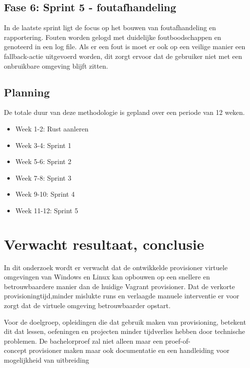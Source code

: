 \subsection{Fase 6: Sprint 5 - foutafhandeling}
In de laatste sprint ligt de focus op het bouwen van foutafhandeling en rapportering. Fouten worden gelogd met duidelijke foutboodschappen en genoteerd in een log file. Als er een fout is moet er ook op een veilige manier een fallback-actie uitgevoerd worden, dit zorgt ervoor dat de gebruiker niet met een onbruikbare omgeving blijft zitten.


\subsection{Planning}
De totale duur van deze methodologie is gepland over een periode van 12 weken.
\begin{itemize}
    \item Week 1-2: Rust aanleren
    \item Week 3-4: Sprint 1
    \item Week 5-6: Sprint 2
    \item Week 7-8: Sprint 3
    \item Week 9-10: Sprint 4
    \item Week 11-12: Sprint 5
\end{itemize}


\section{Verwacht resultaat, conclusie}%
\label{sec:verwachte_resultaten}
In dit onderzoek wordt er verwacht dat de ontwikkelde provisioner virtuele omgevingen van Windows en Linux kan opbouwen op een snellere en betrouwbaardere manier dan de huidige Vagrant provisioner. Dat de verkorte provisioningtijd,minder mislukte runs en verlaagde manuele interventie er voor zorgt dat de virtuele omgeving betrouwbaarder opstart.

Voor de doelgroep, opleidingen die dat gebruik maken van provisioning, betekent dit dat lessen, oefeningen en projecten minder tijdverlies hebben door technische problemen. De bachelorproef zal niet alleen maar een proef-of-\\concept provisioner maken maar ook documentatie en een handleiding voor mogelijkheid van uitbreiding

\newpage

